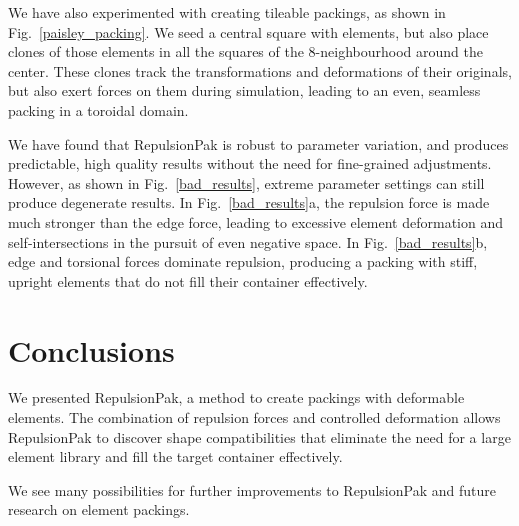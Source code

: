 We have also experimented with creating tileable packings, as shown
in Fig.~\ref{paisley_packing}.  We seed a central square with elements,
but also place clones of those elements in all the squares of the
8-neighbourhood around the center.  These clones track the transformations
and deformations of their originals, but also exert forces on them during
simulation, leading to an even, seamless packing in a toroidal domain.

We have found that RepulsionPak is robust to parameter variation, and 
produces predictable, high quality results without the need for fine-grained
adjustments.  However, as shown in Fig.~\ref{bad_results}, extreme parameter 
settings can still produce degenerate results.
In Fig.~\ref{bad_results}a, the repulsion force is made much stronger than 
the edge force, leading to excessive element deformation and
self-intersections in the pursuit of even negative space.  In 
Fig.~\ref{bad_results}b, edge and torsional forces dominate repulsion,
producing a packing with stiff, upright elements that do not fill their
container effectively.


\section{Conclusions}
\label{repulsionpak_conclusions}


We presented RepulsionPak, a method to create packings with deformable elements.
The combination of repulsion forces and controlled deformation
allows RepulsionPak to discover shape compatibilities that
eliminate the need for a large element library
and fill the target container effectively.

We see many possibilities for further improvements to RepulsionPak
and future research on element packings.


